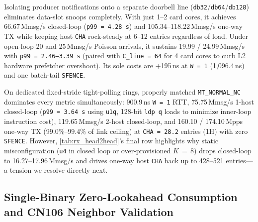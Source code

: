Isolating producer notifications onto a separate doorbell line (\texttt{db32}/\texttt{db64}/\texttt{db128}) eliminates data-slot snoops completely. With just 1--2 card cores, it achieves 66.67\,Mmsg/s closed-loop (\texttt{p99\,=\,4.28\,\textmu s}) and 105.34--118.22\,Mmsg/s one-way TX while keeping host \texttt{CHA} rock-steady at 6--12 entries regardless of load. Under open-loop 20 and 25\,Mmsg/s Poisson arrivals, it sustains 19.99 / 24.99\,Mmsg/s with \texttt{p99\,=\,2.46--3.39\,\textmu s} (paired with \texttt{C\_line\,=\,64} for 4 card cores to curb L2 hardware prefetcher overshoot). Its sole costs are +195\,ns at \texttt{W\,=\,1} (1,096.4\,ns) and one batch-tail \texttt{SFENCE}.

On dedicated fixed-stride tight-polling rings, properly matched \texttt{MT\_NORMAL\_NC} dominates every metric simultaneously: 900.9\,ns \texttt{W\,=\,1} RTT, 75.75\,Mmsg/s 1-host closed-loop (\texttt{p99\,=\,3.64\,\textmu s} using \texttt{u1q}, 128-bit \texttt{ldp q} loads to minimize inner-loop instruction cost), 119.65\,Mmsg/s 2-host closed-loop, and 160.10 / 174.10\,Mpps one-way TX (99.0\%--99.4\% of link ceiling) at \texttt{CHA\,=\,28.2} entries (1H) with zero \texttt{SFENCE}. However, \autoref{tab:rx_head2head}'s final row highlights why static misconfiguration (\texttt{u4} in closed loop or over-provisioned $K\,=\,8$) drops closed-loop to 16.27--17.96\,Mmsg/s and drives one-way host \texttt{CHA} back up to 428--521 entries---a tension we resolve directly next.

\subsection{Single-Binary Zero-Lookahead Consumption and CN106 Neighbor Validation}
\label{sec:eval_single_bin}

